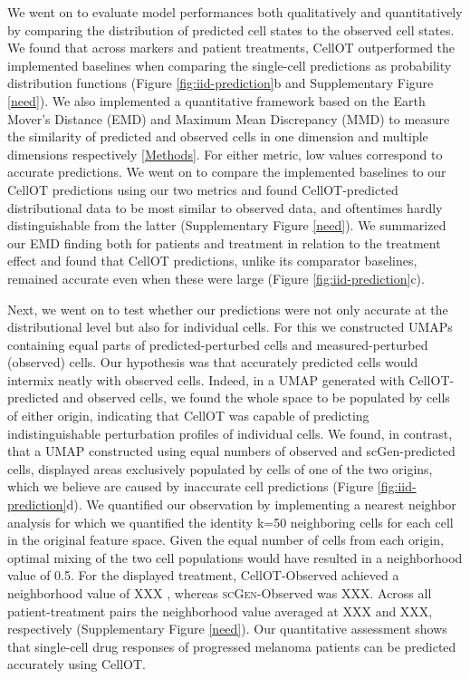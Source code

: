 We went on to evaluate model performances both qualitatively and quantitatively by comparing the distribution of predicted cell states to the observed cell states.
We found that across markers and patient treatments, CellOT outperformed the implemented baselines when comparing the single-cell predictions as probability distribution functions (Figure \ref{fig:iid-prediction}b and Supplementary Figure \ref{need}).
We also implemented a quantitative framework based on the Earth Mover’s Distance (EMD) \cite{villani2009} and Maximum Mean Discrepancy (MMD) \cite{gretton2012} to measure the similarity of predicted and observed cells in one dimension and multiple dimensions respectively \ref{Methods}.
For either metric, low values correspond to accurate predictions.
We went on to compare the implemented baselines to our CellOT predictions using our two metrics and found CellOT-predicted distributional data to be most similar to observed data, and oftentimes hardly distinguishable from the latter (Supplementary Figure \ref{need}).
We summarized our EMD finding both for patients and treatment in relation to the treatment effect and found that CellOT predictions, unlike its comparator baselines, remained accurate even when these were large (Figure \ref{fig:iid-prediction}c).  

Next, we went on to test whether our predictions were not only accurate at the distributional level but also for individual cells.
For this we constructed UMAPs containing equal parts of predicted-perturbed cells and measured-perturbed (observed) cells.
Our hypothesis was that accurately predicted cells would intermix neatly with observed cells.
Indeed, in a UMAP generated with CellOT-predicted and observed cells, we found the whole space to be populated by cells of either origin, indicating that CellOT was capable of predicting indistinguishable perturbation profiles of individual cells.
We found, in contrast, that a UMAP constructed using equal numbers of observed and scGen-predicted cells, displayed areas exclusively populated by cells of one of the two origins, which we believe are caused by inaccurate cell predictions (Figure \ref{fig:iid-prediction}d).
We quantified our observation by implementing a nearest neighbor analysis for which we quantified the identity k=50 neighboring cells for each cell in the original feature space.
Given the equal number of cells from each origin, optimal mixing of the two cell populations would have resulted in a neighborhood value of 0.5. For the displayed treatment, CellOT-Observed achieved a neighborhood value of XXX , whereas \textsc{scGen}-Observed was XXX.
Across all patient-treatment pairs the neighborhood value averaged at XXX and XXX, respectively (Supplementary Figure \ref{need}).
Our quantitative assessment shows that single-cell drug responses of progressed melanoma patients can be predicted accurately using CellOT. 

